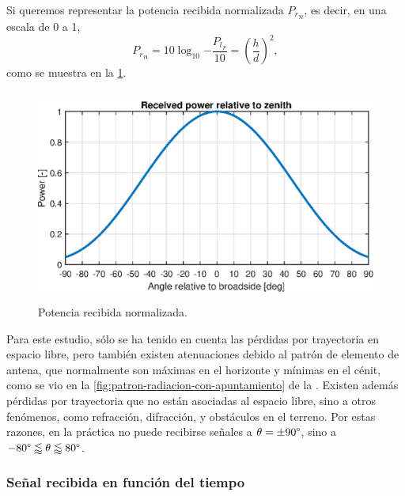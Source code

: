 \documentclass{article}
\newenvironment{standalone}{\begin{preview}}{\end{preview}}
\begin{document}
\begin{standalone}
  Si queremos representar la potencia recibida normalizada ${P_r}_n$, es decir, en una escala de 0 a 1,
  \begin{equation}
    {P_r}_n = 10 \log_{10}{ -\frac{{P_l}_r}{10} } = \left( \frac{h}{d} \right)^2,
  \end{equation}
  como se muestra en la \cref{fig:received-power}.

  \begin{figure}[!htbp]
    \centering
    \includegraphics[width=\linewidth, height=70mm, keepaspectratio]{../images/received-power.eps}
    \caption{Potencia recibida normalizada.}
    \label{fig:received-power}
  \end{figure}

  Para este estudio, sólo se ha tenido en cuenta las pérdidas por trayectoria en espacio libre, pero también existen atenuaciones debido al patrón de elemento de antena, que normalmente son máximas en el horizonte y mínimas en el cénit, como se vio en la \cref{fig:patron-radiacion-con-apuntamiento} de la .
  Existen además pérdidas por trayectoria que no están asociadas al espacio libre, sino a otros fenómenos, como refracción, difracción, y obstáculos en el terreno.
  Por estas razones, en la práctica no puede recibirse señales a $\theta = \pm 90 \degree$, sino a $-80\degree \lessapprox \theta \lessapprox 80\degree$.


  \subsubsection{Señal recibida en función del tiempo}


\end{standalone}
\end{document}
